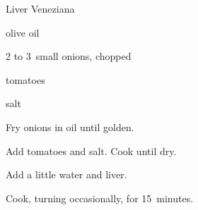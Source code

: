 \begin{recipe}{Liver Veneziana}{}{}

\begin{ingredients}
\item {}
\item olive oil
\item 2 to 3~small onions, chopped
\item tomatoes
\item salt
\end{ingredients}

\begin{directions}
\item Fry onions in oil until golden.
\item Add tomatoes and salt. Cook until dry.
\item Add a little water and liver.
\item Cook, turning occasionally, for 15~minutes.
\end{directions}

\end{recipe}
